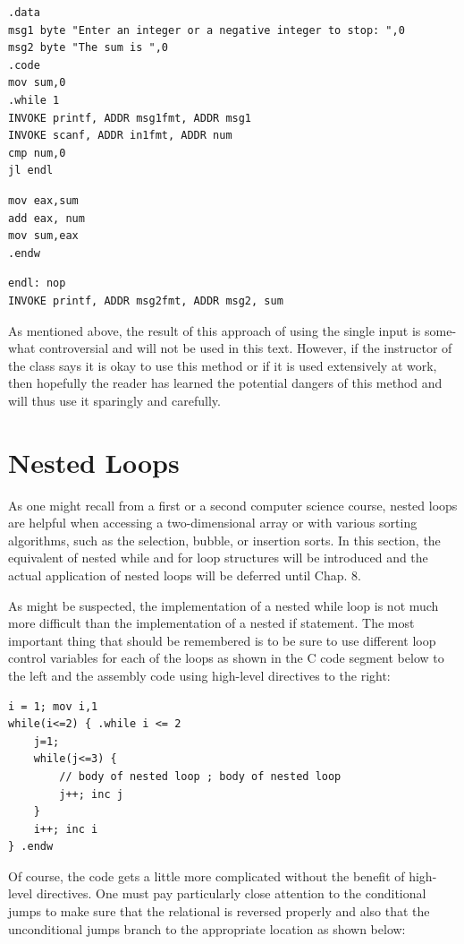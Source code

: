 \documentclass[10pt]{book}
\begin{document}
\begin{verbatim}
.data
msg1 byte "Enter an integer or a negative integer to stop: ",0
msg2 byte "The sum is ",0
.code
mov sum,0
.while 1
INVOKE printf, ADDR msg1fmt, ADDR msg1
INVOKE scanf, ADDR in1fmt, ADDR num
cmp num,0
jl endl
\end{verbatim}

\begin{verbatim}
mov eax,sum
add eax, num
mov sum,eax
.endw
\end{verbatim}

\begin{verbatim}
endl: nop
INVOKE printf, ADDR msg2fmt, ADDR msg2, sum
\end{verbatim}

As mentioned above, the result of this approach of using the single input is some-what controversial and will not be used in this text. However, if the instructor of the class says it is okay to use this method or if it is used extensively at work, then hopefully the reader has learned the potential dangers of this method and will thus use it sparingly and carefully.

\section{Nested Loops}
As one might recall from a first or a second computer science course, nested loops are helpful when accessing a two-dimensional array or with various sorting algorithms, such as the selection, bubble, or insertion sorts. In this section, the equivalent of nested while and for loop structures will be introduced and the actual application of nested loops will be deferred until Chap. 8.

As might be suspected, the implementation of a nested while loop is not much more difficult than the implementation of a nested if statement. The most important thing that should be remembered is to be sure to use different loop control variables for each of the loops as shown in the C code segment below to the left and the assembly code using high-level directives to the right:

\begin{verbatim}
i = 1; mov i,1
while(i<=2) { .while i <= 2
    j=1;
    while(j<=3) {
        // body of nested loop ; body of nested loop
        j++; inc j
    }
    i++; inc i
} .endw
\end{verbatim}

Of course, the code gets a little more complicated without the benefit of high-level directives. One must pay particularly close attention to the conditional jumps to make sure that the relational is reversed properly and also that the unconditional jumps branch to the appropriate location as shown below:
\end{document}
